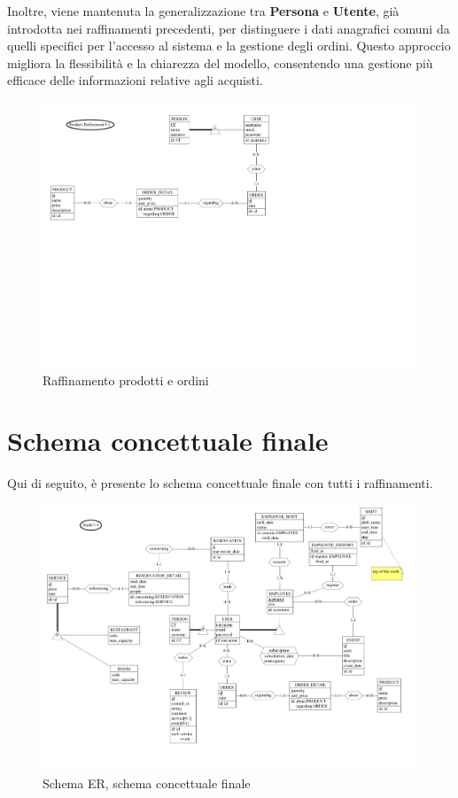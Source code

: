 \documentclass[a4paper,12pt]{report}
\begin{document}
\vspace{\baselineskip}
Inoltre, viene mantenuta la generalizzazione tra \textbf{Persona} e
\textbf{Utente}, già
introdotta nei raffinamenti precedenti, per distinguere i dati
anagrafici comuni da quelli
specifici per l'accesso al sistema e la gestione degli ordini. Questo
approccio migliora la
flessibilità e la chiarezza del modello, consentendo una gestione più efficace
delle informazioni relative agli acquisti.
\begin{figure}[H]
  \centering
  \includegraphics[width=\textwidth, trim=0 300pt 325pt 0,
  clip]{./schemas/refinements/product.pdf}
  \caption{Raffinamento prodotti e ordini}
  \label{fig:raffinamento-prodotto-ordini}
\end{figure}

\newpage
\section{Schema concettuale finale}
Qui di seguito, è presente lo schema concettuale finale con tutti i
raffinamenti.

\begin{figure}[H]
  \centering
  \includegraphics[width=\textwidth, trim=0 0 0
  0]{./schemas/refinements/final.pdf}
  \caption{Schema ER, schema concettuale finale}
  \label{fig:schema-finale}
\end{figure}
\end{document}
